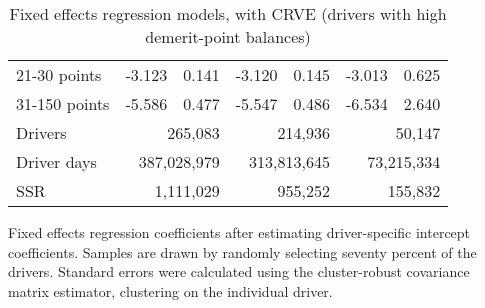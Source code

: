 \begin{table}
\begin{tabular}{l r r r r r r}
21-30 points  & -3.123  &  0.141  & -3.120  &  0.145  & -3.013  &  0.625   \\ 
 
31-150 points  & -5.586  &  0.477  & -5.547  &  0.486  & -6.534  &  2.640   \\ 
 

\hline 
 

Drivers 
 & \multicolumn{2}{r}{265,083}  & \multicolumn{2}{r}{214,936}  & \multicolumn{2}{r}{50,147}   \\ 
 

Driver days 
 & \multicolumn{2}{r}{387,028,979}  & \multicolumn{2}{r}{313,813,645}  & \multicolumn{2}{r}{73,215,334}   \\ 
 

SSR 
 & \multicolumn{2}{r}{1,111,029}  & \multicolumn{2}{r}{955,252}  & \multicolumn{2}{r}{155,832}   \\ 
 

\hline 
 
\end{tabular} 
\caption{Fixed effects regression models, with CRVE (drivers with high demerit-point balances)} 
Fixed effects regression coefficients after estimating driver-specific intercept coefficients. 
Samples are drawn by randomly selecting seventy percent of the drivers. 
Standard errors were calculated using the cluster-robust covariance matrix estimator, 
clustering on the individual driver. 
\label{tab:FE_regs_CRVE_high_pts} 
\end{table} 
 
